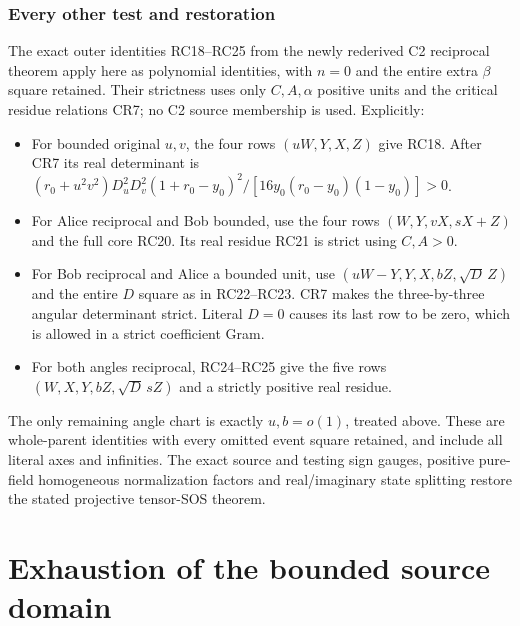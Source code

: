 \subsubsection*{Every other test and restoration}

The exact outer identities RC18--RC25 from the newly rederived
C2 reciprocal theorem apply here as polynomial identities, with
$n=0$ and the entire extra $\beta$ square retained. Their strictness
uses only $C,A,\alpha$ positive units and the critical residue
relations CR7; no C2 source membership is used. Explicitly:
\begin{itemize}
\item For bounded original $u,v$, the four rows $(uW,Y,X,Z)$
give RC18. After CR7 its real determinant is
$ (r_0+u^2v^2)D_u^2D_v^2(1+r_0-y_0)^2/
[16y_0(r_0-y_0)(1-y_0)]>0$.
\item For Alice reciprocal and Bob bounded, use the four rows
$(W,Y,vX,sX+Z)$ and the full core RC20. Its real residue RC21
is strict using $C,A>0$.
\item For Bob reciprocal and Alice a bounded unit, use
$(uW-Y,Y,X,bZ,\sqrt D\,Z)$ and the entire $D$ square as in
RC22--RC23. CR7 makes the three-by-three angular determinant
strict. Literal $D=0$ causes its last row to be zero, which is
allowed in a strict coefficient Gram.
\item For both angles reciprocal, RC24--RC25 give the five rows
$(W,X,Y,bZ,\sqrt D\,sZ)$ and a strictly positive real residue.
\end{itemize}
The only remaining angle chart is exactly $u,b=o(1)$, treated
above. These are whole-parent identities with every omitted event
square retained, and include all literal axes and infinities.
The exact source and testing sign gauges, positive pure-field
homogeneous normalization factors and real/imaginary state splitting
restore the stated projective tensor-SOS theorem.



\section{Exhaustion of the bounded source domain}
\label{component:pc0b2849f8d09}

\label{pc0b2849f8d09:sec:positive-scale-union-rederived}

